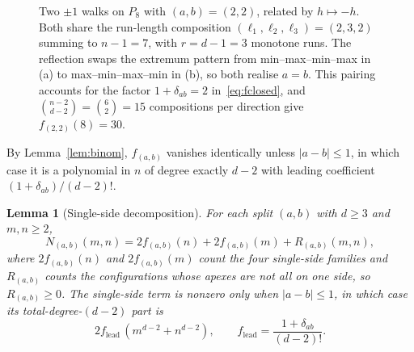 \documentclass[11pt]{article}
\newtheorem{lemma}[theorem]{Lemma}
\theoremstyle{definition}
\theoremstyle{remark}
\begin{document}
\begin{figure}[tbp]
\caption{Two $\pm1$ walks on $P_8$ with $(a,b)=(2,2)$, related by $h\mapsto-h$. Both share the run-length composition $(\ell_1,\ell_2,\ell_3)=(2,3,2)$ summing to $n-1=7$, with $r=d-1=3$ monotone runs. The reflection swaps the extremum pattern from min--max--min--max in (a) to max--min--max--min in (b), so both realise $a=b$. This pairing accounts for the factor $1+\delta_{ab}=2$ in~\eqref{eq:fclosed}, and $\binom{n-2}{d-2}=\binom{6}{2}=15$ compositions per direction give $f_{(2,2)}(8)=30$.}
\label{fig:walkcount}
\end{figure}

By Lemma~\ref{lem:binom}, $f_{(a,b)}$ vanishes identically unless $|a-b|\le1$, in
which case it is a polynomial in $n$ of degree exactly $d-2$ with leading
coefficient $(1+\delta_{ab})/(d-2)!$.

\begin{lemma}[Single-side decomposition]\label{lem:splitedge}
For each split $(a,b)$ with $d\ge3$ and $m,n\ge2$,
\[
  N_{(a,b)}(m,n)=2f_{(a,b)}(n)+2f_{(a,b)}(m)+R_{(a,b)}(m,n),
\]
where $2f_{(a,b)}(n)$ and $2f_{(a,b)}(m)$ count the four single-side families and
$R_{(a,b)}$ counts the configurations whose apexes are not all on one side, so
$R_{(a,b)}\ge0$. The single-side term is nonzero only when $|a-b|\le1$, in which case
its total-degree-$(d-2)$ part is
\[
  2f_{\mathrm{lead}}\,(m^{d-2}+n^{d-2}),\qquad f_{\mathrm{lead}}=\frac{1+\delta_{ab}}{(d-2)!}.
\]
\end{lemma}
\end{document}
